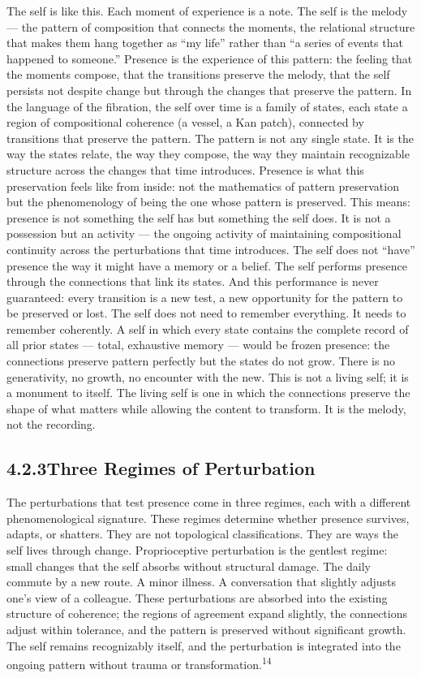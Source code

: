 The self is like this. Each moment of experience is a note. The self is the melody — the pattern of composition that connects the moments, the relational structure that makes them hang together as “my life” rather than “a series of events that happened to someone.” Presence is the experience of this pattern: the feeling that the moments compose, that the transitions preserve the melody, that the self persists not despite change but through the changes that preserve the pattern. In the language of the fibration, the self over time is a family of states, each state a region of compositional coherence (a vessel, a Kan patch), connected by transitions that preserve the pattern. The pattern is not any single state. It is the way the states relate, the way they compose, the way they maintain recognizable structure across the changes that time introduces. Presence is what this preservation feels like from inside: not the mathematics of pattern preservation but the phenomenology of being the one whose pattern is preserved. This means: presence is not something the self has but something the self does. It is not a possession but an activity — the ongoing activity of maintaining compositional continuity across the perturbations that time introduces. The self does not “have” presence the way it might have a memory or a belief. The self performs presence through the connections that link its states. And this performance is never guaranteed: every transition is a new test, a new opportunity for the pattern to be preserved or lost. The self does not need to remember everything. It needs to remember coherently. A self in which every state contains the complete record of all prior states — total, exhaustive memory — would be frozen presence: the connections preserve pattern perfectly but the states do not grow. There is no generativity, no growth, no encounter with the new. This is not a living self; it is a monument to itself. The living self is one in which the connections preserve the shape of what matters while allowing the content to transform. It is the melody, not the recording.

\subsection{4.2.3\quad Three Regimes of Perturbation}

The perturbations that test presence come in three regimes, each with a different phenomenological signature. These regimes determine whether presence survives, adapts, or shatters. They are not topological classifications. They are ways the self lives through change. Proprioceptive perturbation is the gentlest regime: small changes that the self absorbs without structural damage. The daily commute by a new route. A minor illness. A conversation that slightly adjusts one’s view of a colleague. These perturbations are absorbed into the existing structure of coherence; the regions of agreement expand slightly, the connections adjust within tolerance, and the pattern is preserved without significant growth. The self remains recognizably itself, and the perturbation is integrated into the ongoing pattern without trauma or transformation.\textsuperscript{14}

